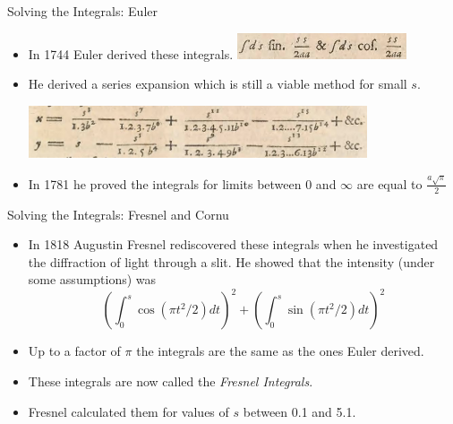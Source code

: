 \documentclass{beamer}
\begin{document}
\begin{frame}{Solving the Integrals: Euler}
	\begin{itemize}
		\item In 1744 Euler derived these integrals.
		\includegraphics[width=50mm, scale=0.5]{euler_scripture_1.png}	
		\item He derived a series expansion which is still a viable method for small $s$.
		
		\includegraphics[width=100mm, scale=0.7]{euler_scripture.png}
		
		\item In 1781 he proved the integrals for limits between 0 and $\infty$ are equal to  $\frac{a \sqrt{\pi}}{2}$ 
	\end{itemize}
\end{frame}

\begin{frame}{Solving the Integrals: Fresnel and Cornu}
	\begin{itemize}
		\item In 1818 Augustin Fresnel rediscovered these integrals when he investigated the diffraction of light through a slit. He showed that the intensity (under some assumptions) was 
		\[
		\left( \int_{0}^{s}\cos \left( \pi t^2 / 2 \right) dt \right) ^2 + 
		\left( \int_{0}^{s}\sin \left( \pi t^2 / 2 \right) dt \right) ^2
		\] 
		\item Up to a factor of $\pi$ the integrals are the same as the ones Euler derived.
		\item These integrals are now called the \emph{Fresnel Integrals}.
		\item Fresnel calculated them for values of $s$ between 0.1 and 5.1.
	\end{itemize}
\end{frame}
\end{document}
